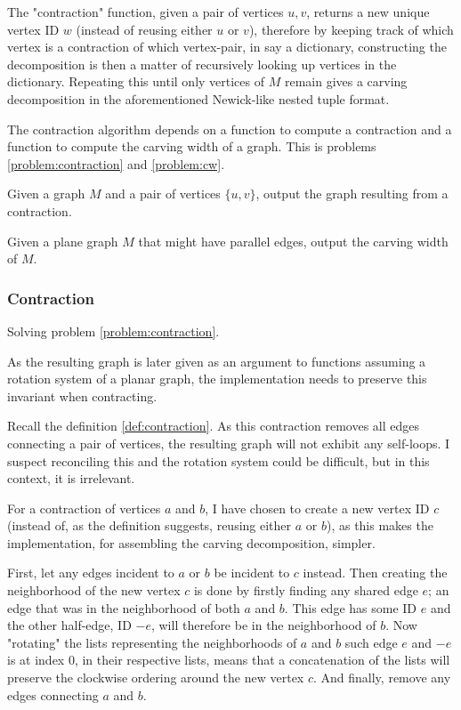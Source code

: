 \documentclass{article}
\begin{document}
		The "contraction" function, given a pair of vertices $u,v$, returns a new unique vertex ID $w$ (instead of reusing either $u$ or $v$), therefore by keeping track of which vertex is a contraction of which vertex-pair, in say a dictionary, constructing the decomposition is then a matter of recursively looking up vertices in the dictionary. Repeating this until only vertices of $M$ remain gives a carving decomposition in the aforementioned Newick-like nested tuple format.


		The contraction algorithm depends on a function to compute a contraction and a function to compute the carving width of a graph. This is problems \ref{problem:contraction} and \ref{problem:cw}.

		\begin{problem}\label{problem:contraction}
			Given a graph $M$ and a pair of vertices $\{u, v\}$, output the graph resulting from a contraction.
		\end{problem}

		\begin{problem}\label{problem:cw}
			Given a plane graph $M$ that might have parallel edges, output the carving width of $M$.
		\end{problem}

		\subsubsection{Contraction}

			Solving problem \ref{problem:contraction}.

			As the resulting graph is later given as an argument to functions assuming a rotation system of a planar graph, the implementation needs to preserve this invariant when contracting.

			Recall the definition \ref{def:contraction}. As this contraction removes all edges connecting a pair of vertices, the resulting graph will not exhibit any self-loops. I suspect reconciling this and the rotation system could be difficult, but in this context, it is irrelevant.

			For a contraction of vertices $a$ and $b$, I have chosen to create a new vertex ID $c$ (instead of, as the definition suggests, reusing either $a$ or $b$), as this makes the implementation, for assembling the carving decomposition, simpler.

			First, let any edges incident to $a$ or $b$ be incident to $c$ instead. Then creating the neighborhood of the new vertex $c$ is done by firstly finding any shared edge $e$; an edge that was in the neighborhood of both $a$ and $b$. This edge has some ID $e$ and the other half-edge, ID $-e$, will therefore be in the neighborhood of $b$. Now "rotating" the lists representing the neighborhoods of $a$ and $b$ such edge $e$ and $-e$ is at index 0, in their respective lists, means that a concatenation of the lists will preserve the clockwise ordering around the new vertex $c$. And finally, remove any edges connecting $a$ and $b$.
			
\end{document}
